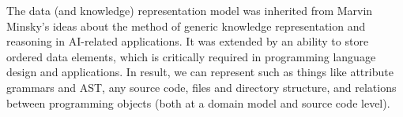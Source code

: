 \secdown

\clearpage

The data (and knowledge) representation model was inherited from Marvin Minsky's
ideas about the method of generic knowledge representation and reasoning in
AI-related applications. It was extended by an ability to store ordered data
elements, which is critically required in programming language design and
applications. In result, we can represent such as things like attribute grammars
and AST, any source code, files and directory structure, and relations between
programming objects (both at a domain model and source code level).






\secup

